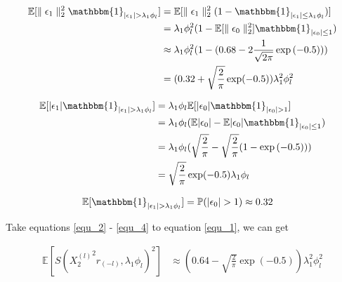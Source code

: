 \documentclass[12pt]{article}
\begin{document}
  \begin{equation} \label{equ_2}
    \begin{split}
  \mathbb{E}[\parallel \epsilon_1 \parallel_2^2 \mathbbm{1}_{|\epsilon_1|>\lambda_1\phi_l}] & = 
  \mathbb{E}[\parallel \epsilon_1 \parallel_2^2 (1-  \mathbbm{1}_{|\epsilon_1|\leq\lambda_1\phi_l})] \\
  & = \lambda_1\phi_l^2(1- \mathbb{E}[ \parallel \epsilon_0 \parallel_2^2 ] \mathbbm{1}_{|\epsilon_0|\leq 1}  ) \\
  & \approx \lambda_1\phi_l^2(1- ( 0.68- 2 \frac{1}{\sqrt{2\pi}} \exp{(-0.5)} )  ) \\
  & = (0.32 +\sqrt{\frac{2}{\pi}}\exp(-0.5) ) \lambda_1^2\phi_l^2 \\
\end{split}
\end{equation}
  
  \begin{equation} \label{equ_3}
    \begin{split}
  \mathbb{E}[|\epsilon_1|\mathbbm{1}_{|\epsilon_1|>\lambda_1\phi_l}] & = \lambda_1\phi_l \mathbb{E}[|\epsilon_0|\mathbbm{1}_{|\epsilon_0|>1}]  \\
  & = \lambda_1\phi_l (\mathbb{E}|\epsilon_0| - \mathbb{E}|\epsilon_0| \mathbbm{1}_{|\epsilon_0|\leq 1} ) \\
  & =  \lambda_1\phi_l( \sqrt{\frac{2}{\pi}} - \sqrt{\frac{2}{\pi}} (1-\exp{(-0.5)}) )    \\ 
  & = \sqrt{\frac{2}{\pi}}\exp(-0.5) \lambda_1\phi_l \\
\end{split}
\end{equation}
  
  \begin{equation} \label{equ_4}
    \begin{split}
  \mathbb{E}[\mathbbm{1}_{|\epsilon_1|>\lambda_1\phi_l}] & = \mathbb{P}(|\epsilon_0|>1) \approx 0.32 
  \end{split}
\end{equation}

Take equations \ref{equ_2} - \ref{equ_4} to equation \ref{equ_1}, we can get

\begin{equation} \label{equ_5}
  \begin{split}
    \mathbb{E}[S( {X_2^{(l)}}^2 r_{(-l)},\lambda_1\phi_l)^2] &  \approx (0.64- \sqrt{\frac{2}{\pi}}\exp(-0.5) ) \lambda_1^2\phi_l^2
  \end{split}
\end{equation}
\end{document}
